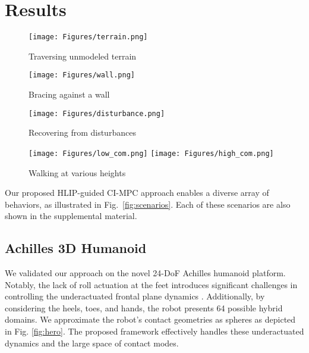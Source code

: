 \section{Results}\label{sec:results}

\begin{figure*}
    \vspace{10pt} 
    \centering
    \begin{subfigure}{0.24\linewidth}
        \texttt{[image: Figures/terrain.png]}
        \caption{Traversing unmodeled terrain}
        \label{fig:scenarios:terrain}
    \end{subfigure}
    \begin{subfigure}{0.24\linewidth}
        \texttt{[image: Figures/wall.png]}
        \caption{Bracing against a wall}
        \label{fig:scenarios:wall}
    \end{subfigure}
    \begin{subfigure}{0.24\linewidth}
        \texttt{[image: Figures/disturbance.png]}
        \caption{Recovering from disturbances}
        \label{fig:scenarios:wall}
    \end{subfigure}
    \begin{subfigure}{0.24\linewidth}
        \texttt{[image: Figures/low\_com.png]}
        \texttt{[image: Figures/high\_com.png]}
        \caption{Walking at various heights}
        \label{fig:scenarios:com}
    \end{subfigure}
    \caption{The Achilles humanoid in various simulation test scenarios. HLIP guides the robot toward a reasonable gait, while CI-MPC provides the flexibility to make and break contact on the fly.}
    \label{fig:scenarios}
\end{figure*}

Our proposed HLIP-guided CI-MPC approach enables a diverse array of behaviors, as illustrated in Fig.~\ref{fig:scenarios}. Each of these scenarios are also shown in the supplemental material. 
%
\subsection{Achilles 3D Humanoid}
We validated our approach on the novel 24-DoF Achilles humanoid platform. Notably, the lack of roll actuation at the feet introduces significant challenges in controlling the underactuated frontal plane dynamics \cite{westervelt2018feedback, buss2014preliminary}. Additionally, by considering the heels, toes, and hands, the robot presents 64 possible hybrid domains. We approximate the robot's contact geometries as spheres as depicted in Fig. \ref{fig:hero}. The proposed framework effectively handles these underactuated dynamics and the large space of contact modes.
%
